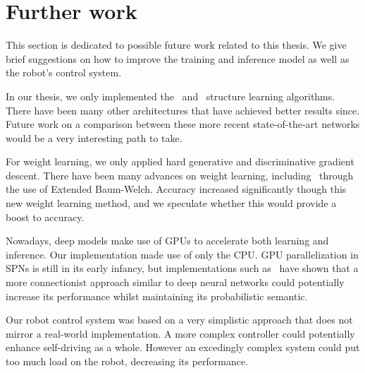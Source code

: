 \section{Further work}

This section is dedicated to possible future work related to this thesis. We give brief suggestions
on how to improve the training and inference model as well as the robot's control system.

In our thesis, we only implemented the~\cite{gens-domingos} and~\cite{clustering} structure
learning algorithms. There have been many other architectures that have achieved better results
since. Future work on a comparison between these more recent state-of-the-art networks would be a
very interesting path to take.

For weight learning, we only applied hard generative and discriminative gradient descent. There
have been many advances on weight learning, including~\cite{baum-welch} through the use of Extended
Baum-Welch. Accuracy increased significantly though this new weight learning method, and we
speculate whether this would provide a boost to accuracy.

Nowadays, deep models make use of GPUs to accelerate both learning and inference. Our
implementation made use of only the CPU. GPU parallelization in SPNs is still in its early infancy,
but implementations such as~\cite{deep-learn-spn} have shown that a more connectionist approach
similar to deep neural networks could potentially increase its performance whilst maintaining its
probabilistic semantic.

Our robot control system was based on a very simplistic approach that does not mirror a real-world
implementation. A more complex controller could potentially enhance self-driving as a whole.
However an excedingly complex system could put too much load on the robot, decreasing its
performance.
